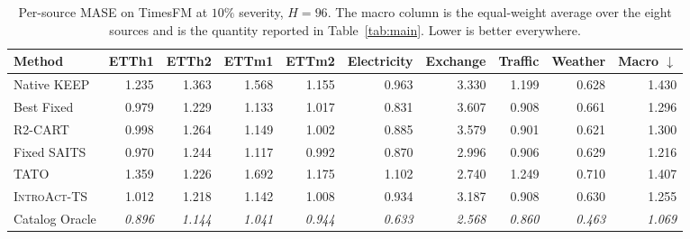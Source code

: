 \documentclass{article}
\newcommand{\oracle}[1]{\textit{\textcolor{phgray}{#1}}}
\newcommand{\introact}{\textsc{IntroAct-TS}}
\begin{document}
\begin{table}[htbp]
  \caption{Per-source MASE on TimesFM at $10\%$ severity, $H=96$. The macro column is the
  equal-weight average over the eight sources and is the quantity reported in
  Table~\ref{tab:main}. Lower is better everywhere.}
  \label{tab:app-src-tf-96}
  \centering
  \small
  \setlength{\tabcolsep}{3pt}
\begin{tabular*}{\textwidth}{@{\extracolsep{\fill}}lrrrrrrrrr@{}}
    \toprule
    Method & ETTh1 & ETTh2 & ETTm1 & ETTm2 & Electricity & Exchange & Traffic & Weather & Macro $\downarrow$ \\
    \midrule
    Native KEEP & 1.235 & 1.363 & 1.568 & 1.155 & 0.963 & 3.330 & 1.199 & 0.628 & 1.430 \\
    Best Fixed & 0.979 & 1.229 & 1.133 & 1.017 & 0.831 & 3.607 & 0.908 & 0.661 & 1.296 \\
    R2-CART & 0.998 & 1.264 & 1.149 & 1.002 & 0.885 & 3.579 & 0.901 & 0.621 & 1.300 \\
    Fixed SAITS & 0.970 & 1.244 & 1.117 & 0.992 & 0.870 & 2.996 & 0.906 & 0.629 & 1.216 \\
    TATO & 1.359 & 1.226 & 1.692 & 1.175 & 1.102 & 2.740 & 1.249 & 0.710 & 1.407 \\
    \midrule
    \rowcolor{bestgray}\introact{} & 1.012 & 1.218 & 1.142 & 1.008 & 0.934 & 3.187 & 0.908 & 0.630 & 1.255 \\
    \midrule
    Catalog Oracle & \oracle{0.896} & \oracle{1.144} & \oracle{1.041} & \oracle{0.944} & \oracle{0.633} & \oracle{2.568} & \oracle{0.860} & \oracle{0.463} & \oracle{1.069} \\
    \bottomrule
  \end{tabular*}
\end{table}
\end{document}
